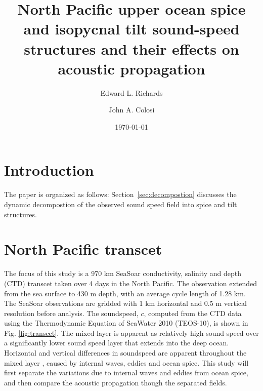 \documentclass[preprint,NumberedRefs]{JASA}
\begin{document}
\title[Mixed layer tilt and spice]{North Pacific upper ocean spice and isopycnal tilt sound-speed structures and their effects on acoustic propagation}
\author{Edward L. Richards}
\author{John A. Colosi}


\date{\today}


\begin{abstract}

\end{abstract}

\maketitle

\section{\label{sec:intro} Introduction}

The paper is organized as follows: Section~\ref{sec:decompostion} discusses the dynamic decompostion of the observed sound speed field into spice and tilt structures.

\section{North Pacific transcet}
The focus of this study is a 970 km SeaSoar conductivity, salinity and depth (CTD) transcet taken over 4 days in the North Pacific\citep{cole2010seasonal}. The observation extended from the sea surface to 430 m depth, with an average cycle length of 1.28 km. The SeaSoar observations are gridded with 1 km horizontal and 0.5 m vertical resolution before analysis. The soundspeed, $c$, computed from the CTD data using the Thermodynamic Equation of SeaWater 2010 (TEOS-10), is shown in Fig. \ref{fig:transcet}. The mixed layer is apparent as relatively high sound speed over a significantly lower sound speed layer that extends into the deep ocean. Horizontal and vertical differences in soundspeed are apparent throughout the mixed layer \citep{colosi2020observations}, caused by internal waves, eddies and ocean spice. This study will first separate the variations due to internal waves and eddies from ocean spice, and then compare the acoustic propagation though the separated fields.
\end{document}

